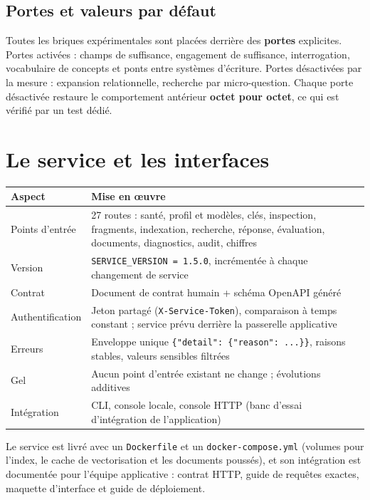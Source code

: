\documentclass[a4paper,12pt]{report}
\begin{document}
\subsection{Portes et valeurs par défaut}
Toutes les briques expérimentales sont placées derrière des \textbf{portes} explicites. Portes
activées : champs de suffisance, engagement de suffisance, interrogation, vocabulaire de concepts
et ponts entre systèmes d'écriture. Portes désactivées par la mesure : expansion relationnelle,
recherche par micro-question. Chaque porte désactivée restaure le comportement antérieur
\textbf{octet pour octet}, ce qui est vérifié par un test dédié.

\section{Le service et les interfaces}
\begin{table}[H]
\centering
\small
\begin{tabular}{p{3.4cm}p{11.1cm}}
\toprule
\textbf{Aspect} & \textbf{Mise en œuvre} \\
\midrule
Points d'entrée & 27 routes : santé, profil et modèles, clés, inspection, fragments, indexation,
recherche, réponse, évaluation, documents, diagnostics, audit, chiffres \\
Version & \texttt{SERVICE\_VERSION = 1.5.0}, incrémentée à chaque changement de service \\
Contrat & Document de contrat humain + schéma OpenAPI généré \\
Authentification & Jeton partagé (\texttt{X-Service-Token}), comparaison à temps constant ; service
prévu derrière la passerelle applicative \\
Erreurs & Enveloppe unique \texttt{\{"detail": \{"reason": ...\}\}}, raisons stables, valeurs
sensibles filtrées \\
Gel & Aucun point d'entrée existant ne change ; évolutions additives \\
Intégration & CLI, console locale, console HTTP (banc d'essai d'intégration de l'application) \\
\bottomrule
\end{tabular}
\end{table}

Le service est livré avec un \texttt{Dockerfile} et un \texttt{docker-compose.yml} (volumes pour
l'index, le cache de vectorisation et les documents poussés), et son intégration est documentée
pour l'équipe applicative : contrat HTTP, guide de requêtes exactes, maquette d'interface et guide
de déploiement.
\end{document}

